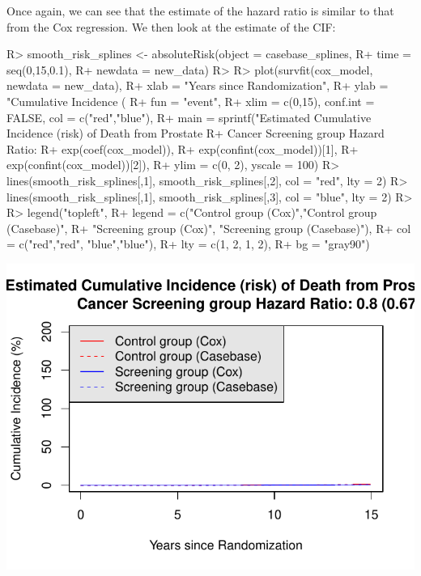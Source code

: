 \documentclass[
]{jss}
\begin{document}
Once again, we can see that the estimate of the hazard ratio is similar
to that from the Cox regression. We then look at the estimate of the
CIF:

\begin{CodeChunk}

\begin{CodeInput}
R> smooth_risk_splines <- absoluteRisk(object = casebase_splines, 
R+                                     time = seq(0,15,0.1), 
R+                                     newdata = new_data)
R> 
R> plot(survfit(cox_model, newdata = new_data),
R+      xlab = "Years since Randomization", 
R+      ylab = "Cumulative Incidence (%
R+      fun = "event",
R+      xlim = c(0,15), conf.int = FALSE, col = c("red","blue"), 
R+      main = sprintf("Estimated Cumulative Incidence (risk) of Death from Prostate 
R+                     Cancer Screening group Hazard Ratio: %
R+                     exp(coef(cox_model)), 
R+                     exp(confint(cox_model))[1], 
R+                     exp(confint(cox_model))[2]),
R+      ylim = c(0, 2), yscale = 100)
R> lines(smooth_risk_splines[,1], smooth_risk_splines[,2], col = "red", lty = 2)
R> lines(smooth_risk_splines[,1], smooth_risk_splines[,3], col = "blue", lty = 2)
R> 
R> legend("topleft", 
R+        legend = c("Control group (Cox)","Control group (Casebase)",
R+                   "Screening group (Cox)", "Screening group (Casebase)"), 
R+        col = c("red","red", "blue","blue"),
R+        lty = c(1, 2, 1, 2), 
R+        bg = "gray90")
\end{CodeInput}


\begin{center}\includegraphics{../figures/erspc-casebase-splines-cif-1} \end{center}

\end{CodeChunk}
\end{document}
